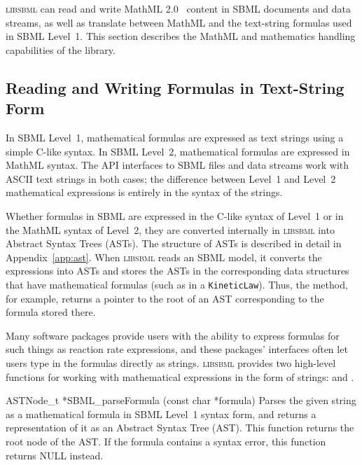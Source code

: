 \documentclass{cekmanual}
\newcommand{\libsbml}{\textsc{libsbml}}
\begin{document}
\libsbml{} can read and write MathML 2.0~\citep{w3c:2000b} content in SBML
documents and data streams, as well as translate between MathML and the
text-string formulas used in SBML Level~1.  This section describes the
MathML and mathematics handling capabilities of the library.


\subsection{Reading and Writing Formulas in Text-String Form}
\label{sec:text-string-math}

In SBML Level~1, mathematical formulas are expressed as text strings using
a simple C-like syntax.  In SBML Level~2, mathematical formulas are
expressed in MathML syntax.  The API interfaces to SBML files and data
streams work with ASCII text strings in both cases; the difference between
Level~1 and Level~2 mathematical expressions is entirely in the syntax of
the strings.

Whether formulas in SBML are expressed in the C-like syntax of Level~1 or
in the MathML syntax of Level~2, they are converted internally in
\libsbml{} into Abstract Syntax Trees (ASTs).  The structure of ASTs is
described in detail in Appendix~\ref{app:ast}.  When \libsbml{} reads an
SBML model, it converts the expressions into ASTs and stores the ASTs in
the corresponding data structures that have mathematical formulas (such as
in a \texttt{KineticLaw}).  Thus, the  method,
for example, returns a pointer to the root of an AST corresponding to the
formula stored there.

Many software packages provide users with the ability to express formulas
for such things as reaction rate expressions, and these packages'
interfaces often let users type in the formulas directly as strings.
\libsbml{} provides two high-level functions for working with mathematical
expressions in the form of strings:  and
.

\begin{methoddef}{ASTNode\_t *SBML\_parseFormula (const char *formula)}
  Parses the given string as a mathematical formula in SBML Level~1 syntax
  form, and returns a representation of it as an Abstract Syntax Tree
  (AST).  This function returns the root node of the AST.  If the formula
  contains a syntax error, this function returns NULL instead.
\end{methoddef}
\end{document}
